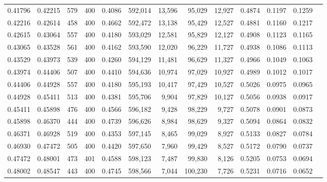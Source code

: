 \begin{tabular}{rrrrrrrrrrrrr}
0.41796 & 0.42215 &    579 & 400 &                                     0.4086 & 592,014 &  13,596 &  95,029 &  12,927 & 0.4874 & 0.1197 & 0.1259 \\
0.42216 & 0.42614 &    458 & 400 &                                     0.4662 & 592,472 &  13,138 &  95,429 &  12,527 & 0.4881 & 0.1160 & 0.1217 \\
0.42615 & 0.43064 &    557 & 400 &                                     0.4180 & 593,029 &  12,581 &  95,829 &  12,127 & 0.4908 & 0.1123 & 0.1165 \\
0.43065 & 0.43528 &    561 & 400 &                                     0.4162 & 593,590 &  12,020 &  96,229 &  11,727 & 0.4938 & 0.1086 & 0.1113 \\
0.43529 & 0.43973 &    539 & 400 &                                     0.4260 & 594,129 &  11,481 &  96,629 &  11,327 & 0.4966 & 0.1049 & 0.1063 \\
0.43974 & 0.44406 &    507 & 400 &                                     0.4410 & 594,636 &  10,974 &  97,029 &  10,927 & 0.4989 & 0.1012 & 0.1017 \\
0.44406 & 0.44928 &    557 & 400 &                                     0.4180 & 595,193 &  10,417 &  97,429 &  10,527 & 0.5026 & 0.0975 & 0.0965 \\
0.44928 & 0.45411 &    513 & 400 &                                     0.4381 & 595,706 &   9,904 &  97,829 &  10,127 & 0.5056 & 0.0938 & 0.0917 \\
0.45411 & 0.45898 &    476 & 400 &                                     0.4566 & 596,182 &   9,428 &  98,229 &   9,727 & 0.5078 & 0.0901 & 0.0873 \\
0.45898 & 0.46370 &    444 & 400 &                                     0.4739 & 596,626 &   8,984 &  98,629 &   9,327 & 0.5094 & 0.0864 & 0.0832 \\
0.46371 & 0.46928 &    519 & 400 &                                     0.4353 & 597,145 &   8,465 &  99,029 &   8,927 & 0.5133 & 0.0827 & 0.0784 \\
0.46930 & 0.47472 &    505 & 400 &                                     0.4420 & 597,650 &   7,960 &  99,429 &   8,527 & 0.5172 & 0.0790 & 0.0737 \\
0.47472 & 0.48001 &    473 & 401 &                                     0.4588 & 598,123 &   7,487 &  99,830 &   8,126 & 0.5205 & 0.0753 & 0.0694 \\
0.48002 & 0.48547 &    443 & 400 &                                     0.4745 & 598,566 &   7,044 & 100,230 &   7,726 & 0.5231 & 0.0716 & 0.0652 \\

\end{tabular}
